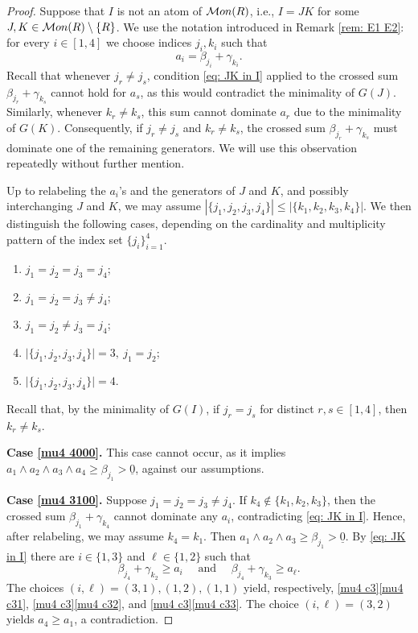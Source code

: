 \documentclass[10pt,a4paper]{amsart}
\providecommand\Mon{{\mathcal{M}{\rm on}}}
\begin{document}
\begin{proof}
Suppose that $I$ is not an atom of $\Mon(R)$, i.e., $I=JK$ for some $J,K\in\Mon(R)\setminus\{R\}$. We use the notation introduced in Remark \ref{rem: E1 E2}: for every $i\in[1,4]$ we choose indices $j_i,k_i$ such that
\[
a_i=\beta_{j_i}+\gamma_{k_i}.
\]
Recall that whenever $j_r\neq j_s$, condition \ref{eq: JK in I} applied to the crossed sum $\beta_{j_r}+\gamma_{k_s}$ cannot hold for $a_s$, as this would contradict the minimality of $G(J)$. Similarly, whenever $k_r\neq k_s$, this sum cannot dominate $a_r$ due to the minimality of $G(K)$. Consequently, if $j_r\neq j_s$ and $k_r\neq k_s$, the crossed sum $\beta_{j_r}+\gamma_{k_s}$ must dominate one of the remaining generators. We will use this observation repeatedly without further mention.

Up to relabeling the $a_i$'s and the generators of $J$ and $K$, and possibly interchanging $J$ and $K$, we may assume $|\{j_1,j_2,j_3,j_4\}|\le|\{k_1,k_2,k_3,k_4\}|$. We then distinguish the following cases, depending on the cardinality and multiplicity pattern of the index set $\{j_i\}_{i=1}^4$.
\begin{enumerate}[label=\textup{(\arabic{*})}, mode=unboxed]
        \item\label{mu4 4000} $j_1 = j_2 = j_3 = j_4$;
        \item\label{mu4 3100}  $j_1=j_2=j_3\neq j_4$;
        
        \item\label{mu4 2200} $j_1=j_2\ne j_3=j_4$;
        
        \item\label{mu4 2110} $\lvert\{j_1,j_2,j_3,j_4\}\rvert = 3,\ j_1=j_2$;
        
        \item\label{mu4 1111} $\lvert\{j_1,j_2,j_3,j_4\}\rvert=4$.
\end{enumerate}
Recall that, by the minimality of $G(I)$, if $j_r=j_{s}$ for distinct $r,s\in[1,4]$, then $k_r\ne k_{s}$.

\smallskip
\textbf{Case \ref{mu4 4000}.} This case cannot occur, as it implies $a_1\wedge a_2\wedge a_3\wedge a_4 \ge \beta_{j_1} > \underline 0$, against our assumptions.

\smallskip
\textbf{Case \ref{mu4 3100}.} Suppose $j_1=j_2=j_3\neq j_4$. If $k_4\notin\{k_1,k_2,k_3\}$, then the crossed sum $\beta_{j_1}+\gamma_{k_4}$ cannot dominate any $a_i$, contradicting \ref{eq: JK in I}. Hence, after relabeling, we may assume $k_4=k_1$. Then $a_1\wedge a_2\wedge a_3\ge \beta_{j_1}>\underline 0.$ By \ref{eq: JK in I} there are $i\in \{1,3\}$ and $\ell\in\{1,2\}$ such that
\[\beta_{j_4}+\gamma_{k_2}\ge a_i \quad\text{ and }\quad \beta_{j_4}+\gamma_{k_3}\ge a_\ell.\] The choices $(i, \ell) = (3, 1), (1, 2), (1, 1)$ yield, respectively, \ref{mu4 c3}\ref{mu4 c31}, \ref{mu4 c3}\ref{mu4 c32}, and \ref{mu4 c3}\ref{mu4 c33}. The choice $(i,\ell)=(3,2)$ yields $a_4\ge a_1$, a contradiction.


\end{proof}
\end{document}
